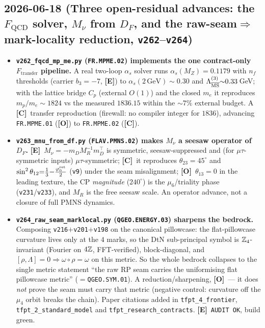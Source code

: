 \documentclass[11pt]{article}
\providecommand{\mE}{\textbf{[E]}}\providecommand{\mC}{\textbf{[C]}}
\providecommand{\mO}{\textbf{[O]}}\providecommand{\mX}{\textbf{[X]}}
\providecommand{\vref}[1]{\texttt{#1}}
\begin{document}
\subsection*{2026-06-18 (Three open-residual advances: the $F_{\mathrm{QCD}}$ solver, $M_\nu$ from $D_F$, and the raw-seam$\Rightarrow$mark-locality reduction, \texttt{v262}--\texttt{v264})}
\begin{itemize}
\item \textbf{\texttt{v262\_fqcd\_mp\_me.py} (\texttt{FR.MPME.02}) implements the one contract-only
  $F_{\mathrm{transfer}}$ pipeline.} A real two-loop $\alpha_s$ solver runs $\alpha_s(M_Z){=}0.1179$ with
  $n_f$ thresholds (carrier $b_3{=}-7$, \mE) to $\alpha_s(2\,\text{GeV}){\sim}0.30$ and
  $\Lambda^{(3)}_{\overline{\rm MS}}{\sim}0.33$\,GeV; with the lattice bridge $C_p$ (external $O(1)$) and the
  closed $m_e$ it reproduces $m_p/m_e{\sim}1824$ vs the measured $1836.15$ within the $\sim7\%$ external
  budget. A \mC\ transfer reproduction (firewall: no compiler integer for $1836$), advancing
  \texttt{FR.MPME.01} (\mO) to \texttt{FR.MPME.02} (\mC).
\item \textbf{\texttt{v263\_mnu\_from\_df.py} (\texttt{FLAV.PMNS.02}) makes $M_\nu$ a seesaw operator of
  $D_F$.} \mE\ $M_\nu=-m_D M_R^{-1} m_D^\top$ is symmetric, seesaw-suppressed and (for $\mu\tau$-symmetric
  inputs) $\mu\tau$-symmetric; \mC\ it reproduces $\theta_{23}{=}45^\circ$ and
  $\sin^2\theta_{12}{=}\tfrac13{-}\tfrac{\varphi_0^{\mathrm{ret}}}{2}$ (\vref{v9}) under the seam misalignment; \mO\
  $\theta_{13}{=}0$ in the leading texture, the CP \emph{magnitude} ($240^\circ$) is the $\mu_6$/triality
  phase (\vref{v231}/\vref{v233}), and $M_R$ is the free seesaw scale. An operator advance, not a closure
  of full PMNS dynamics.
\item \textbf{\texttt{v264\_raw\_seam\_marklocal.py} (\texttt{QGEO.ENERGY.03}) sharpens the bedrock.}
  Composing \vref{v216}$+$\vref{v201}$+$\vref{v198} on the canonical pillowcase: the flat-pillowcase
  curvature lives only at the $4$ marks, so the DtN sub-principal symbol is $\mathbb{Z}_4$-invariant (Fourier on
  $4\mathbb{Z}$, FFT-verified), block-diagonal, and $[\rho,\Lambda]{=}0\Rightarrow\omega\circ\rho{=}\omega$ on this
  metric. So the whole bedrock collapses to the single metric statement ``the raw RP seam carries the
  uniformising flat pillowcase metric'' ($=$\texttt{QGEO.SYM.01}). A reduction/sharpening, \mO\ --- it does
  \emph{not} prove the seam must carry that metric (negative control: curvature off the $\mu_4$ orbit breaks
  the chain). Paper citations added in \texttt{tfpt\_4\_frontier}, \texttt{tfpt\_2\_standard\_model} and
  \texttt{tfpt\_research\_contracts}. \mE\ \texttt{AUDIT OK}, build green.
\end{itemize}
\end{document}
